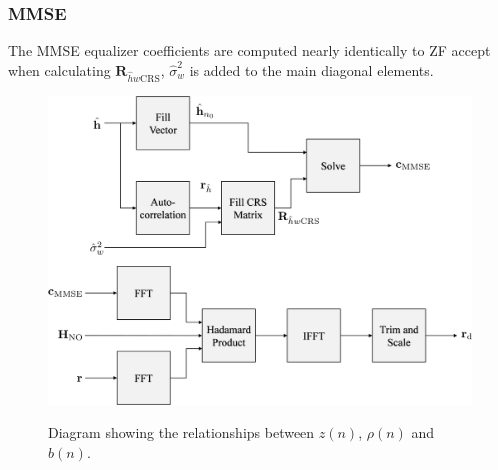 \subsubsection{MMSE}
The MMSE equalizer coefficients are computed nearly identically to ZF accept when calculating $\mathbf{R}_{\hat{h}w\text{CRS}}$, $\hat{\sigma}^2_w$ is added to the main diagonal elements.
\begin{figure}
	\caption{Diagram showing the relationships between $z(n)$, $\rho(n)$ and $b(n)$.}
	\centering\includegraphics[width=9.95in/100*55]{figures/eq_GPUimplementation/blockMMSE.pdf}
	\label{fig:blockMMSE}
\end{figure}


